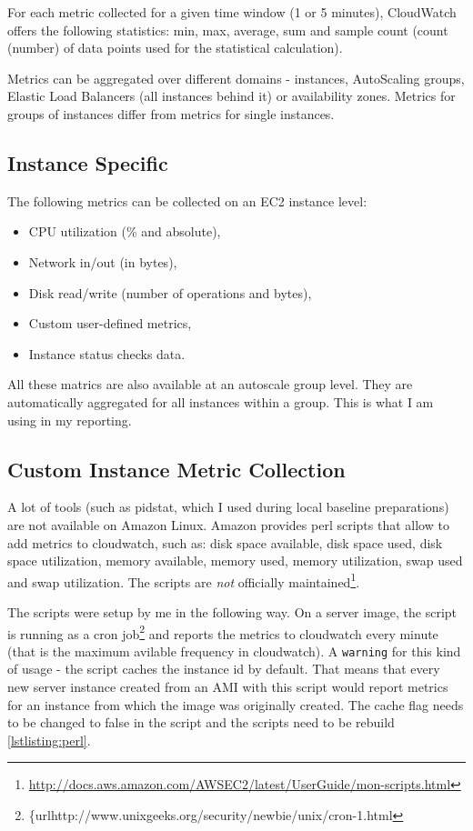 \documentclass{uvamscse}
\begin{document}
For each metric collected for a given time window (1 or 5 minutes), CloudWatch offers the following statistics: min, max, average, sum and sample count (count (number) of data points used for the statistical calculation).

Metrics can be aggregated over different domains - instances, AutoScaling groups, Elastic Load Balancers (all instances behind it) or availability zones. Metrics for groups of instances differ from metrics for single instances.

\subsection{Instance Specific}
The following metrics can be collected on an EC2 instance level:
\begin{itemize}
  \item CPU utilization (\% and absolute),
  \item Network in/out (in bytes),
  \item Disk read/write (number of operations and bytes),
  \item Custom user-defined metrics,
  \item Instance status checks data.
\end{itemize}

All these matrics are also available at an autoscale group level. They are automatically aggregated for all instances within a group. This is what I am using in my reporting.

\subsection{Custom Instance Metric Collection} \label{Custom Metric Collection}
A lot of tools (such as pidstat, which I used during local baseline preparations) are not available on Amazon Linux. Amazon provides perl scripts that allow to add metrics to cloudwatch, such as: disk space available, disk space used, disk space utilization, memory available, memory used, memory utilization, swap used and swap utilization. The scripts are \textit{not} officially maintained\footnote{\url{http://docs.aws.amazon.com/AWSEC2/latest/UserGuide/mon-scripts.html}}.

The scripts were setup by me in the following way. On a server image, the script is running as a cron job\footnote{\{url{http://www.unixgeeks.org/security/newbie/unix/cron-1.html}} and reports the metrics to cloudwatch every minute (that is the maximum avilable frequency in cloudwatch). A \texttt{warning} for this kind of usage - the script caches the instance id by default. That means that every new server instance created from an AMI with this script would report metrics for an instance from which the image was originally created. The cache flag needs to be changed to false in the script and the scripts need to be rebuild \ref{lstlisting:perl}.
\end{document}
